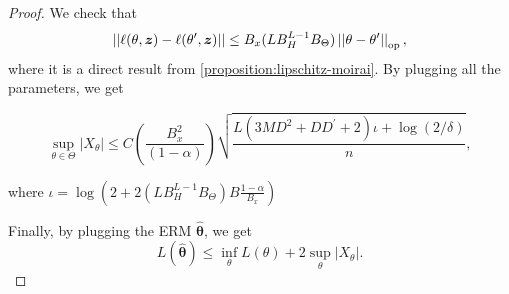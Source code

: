 \begin{proof}
We check that
\[
\left\lvert \left\lvert
\ell(\theta, \bm{z})
-
\ell(\theta^\prime, \bm{z})
\right\rvert \right\rvert
\leq
B_x(L B_H^{L-1} B_{\Theta}) \left\lvert \left\lvert\theta - \theta^\prime\right\rvert \right\rvert_{\text{op}},
\]
where it is a direct result from \cref{proposition:lipschitz-moirai}.
By plugging all the parameters, we get

\[
\sup_{\theta\in\Theta}
|X_{\theta}|
\leq
C
(
\frac{B_x^2}{(1 - \alpha)}
)
\sqrt{
\frac{
L(3MD^2 + D D^\prime + 2) \iota + \log(2/\delta)
}{n}
},
\]

where $\iota = \log( 2 + 2(L B_H^{L-1} B_{\Theta}) B \frac{1-\alpha}{B_x})$


Finally, by plugging the ERM $\hat{\bm{\theta}}$, we get
\[
L(\hat{\bm{\theta}})
\leq
\inf_{\theta} L(\theta)
+
2 \sup_{\theta} | X_{\theta} |.
\]


\end{proof}




